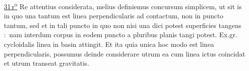 \lbrack%
\href{\Scan{LH_35_11_14_031r}}%
{31\,r\textsuperscript{o}}%
\rbrack%
\pend%
\pstart%
%
Re attentius considerata,%
melius definiemus concursum simplicem,%
ut sit is
in quo una tantum est linea perpendicularis ad contactum,%
non in puncto tantum,
sed et in tali puncto %
in quo non nisi una dici potest superficies%
tangens%
\lbrack:\rbrack\
nam interdum corpus in eodem puncto%
a pluribus planis%
tangi potest.%
Ex.\;gr. cycloidalis linea%
in 
basin%
attingit.
Et ita
quia unica hoc modo est linea perpendicularis,%
possumus deinde considerare
utrum ea cum linea ictus%
coincidat
et utrum transeat
gravitatis.%
\pend%
%
\frenchspacing%
\normalsize%
